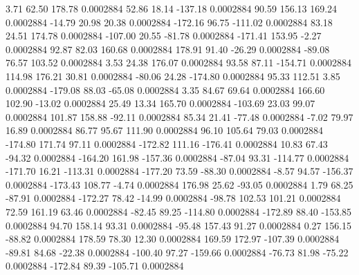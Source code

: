         3.71       62.50      178.78     0.0002884
       52.86       18.14     -137.18     0.0002884
       90.59      156.13      169.24     0.0002884
      -14.79       20.98       20.38     0.0002884
     -172.16       96.75     -111.02     0.0002884
       83.18       24.51      174.78     0.0002884
     -107.00       20.55      -81.78     0.0002884
     -171.41      153.95       -2.27     0.0002884
       92.87       82.03      160.68     0.0002884
      178.91       91.40      -26.29     0.0002884
      -89.08       76.57      103.52     0.0002884
        3.53       24.38      176.07     0.0002884
       93.58       87.11     -154.71     0.0002884
      114.98      176.21       30.81     0.0002884
      -80.06       24.28     -174.80     0.0002884
       95.33      112.51        3.85     0.0002884
     -179.08       88.03      -65.08     0.0002884
        3.35       84.67       69.64     0.0002884
      166.60      102.90      -13.02     0.0002884
       25.49       13.34      165.70     0.0002884
     -103.69       23.03       99.07     0.0002884
      101.87      158.88      -92.11     0.0002884
       85.34       21.41      -77.48     0.0002884
       -7.02       79.97       16.89     0.0002884
       86.77       95.67      111.90     0.0002884
       96.10      105.64       79.03     0.0002884
     -174.80      171.74       97.11     0.0002884
     -172.82      111.16     -176.41     0.0002884
       10.83       67.43      -94.32     0.0002884
     -164.20      161.98     -157.36     0.0002884
      -87.04       93.31     -114.77     0.0002884
     -171.70       16.21     -113.31     0.0002884
     -177.20       73.59      -88.30     0.0002884
       -8.57       94.57     -156.37     0.0002884
     -173.43      108.77       -4.74     0.0002884
      176.98       25.62      -93.05     0.0002884
        1.79       68.25      -87.91     0.0002884
     -172.27       78.42      -14.99     0.0002884
      -98.78      102.53      101.21     0.0002884
       72.59      161.19       63.46     0.0002884
      -82.45       89.25     -114.80     0.0002884
     -172.89       88.40     -153.85     0.0002884
       94.70      158.14       93.31     0.0002884
      -95.48      157.43       91.27     0.0002884
        0.27      156.15      -88.82     0.0002884
      178.59       78.30       12.30     0.0002884
      169.59      172.97     -107.39     0.0002884
      -89.81       84.68      -22.38     0.0002884
     -100.40       97.27     -159.66     0.0002884
      -76.73       81.98      -75.22     0.0002884
     -172.84       89.39     -105.71     0.0002884
